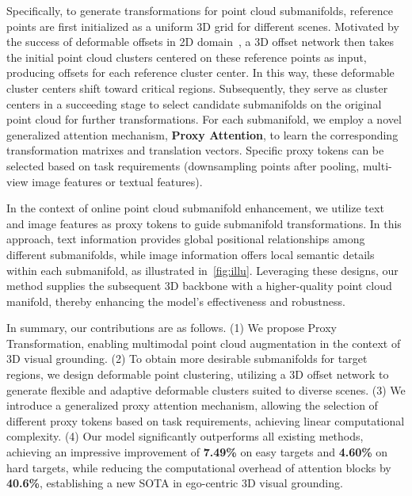 Specifically, to generate transformations for point cloud submanifolds, reference points are first initialized as a uniform 3D grid for different scenes. Motivated by the success of deformable offsets in 2D domain~\cite{xia2022vision,dai2017deformable}, a 3D offset network then takes the initial point cloud clusters centered on these reference points as input, producing offsets for each reference cluster center. In this way, these deformable cluster centers shift toward critical regions. Subsequently, they serve as cluster centers in a succeeding stage to select candidate submanifolds on the original point cloud for further transformations. For each submanifold, we employ a novel generalized attention mechanism, \textbf{Proxy Attention}, to learn the corresponding transformation matrixes and translation vectors. Specific proxy tokens can be selected based on task requirements (\eg downsampling points after pooling, multi-view image features or textual features).



In the context of online point cloud submanifold enhancement, we utilize text and image features as proxy tokens to guide submanifold transformations. In this approach, text information provides global positional relationships among different submanifolds, while image information offers local semantic details within each submanifold, as illustrated in~\cref{fig:illu}. Leveraging these designs, our method supplies the subsequent 3D backbone with a higher-quality point cloud manifold, thereby enhancing the model's effectiveness and robustness.

In summary, our contributions are as follows. (1) We propose Proxy Transformation, enabling multimodal point cloud augmentation in the context of 3D visual grounding. (2) To obtain more desirable submanifolds for target regions, we design deformable point clustering, utilizing a 3D offset network to generate flexible and adaptive deformable clusters suited to diverse scenes. (3) We introduce a generalized proxy attention mechanism, allowing the selection of different proxy tokens based on task requirements, achieving linear computational complexity. (4) Our model significantly outperforms all existing methods, achieving an impressive improvement of \textbf{7.49\%} on easy targets and \textbf{4.60\%} on hard targets, while reducing the computational overhead of attention blocks by \textbf{40.6\%}, establishing a new SOTA in ego-centric 3D visual grounding.




